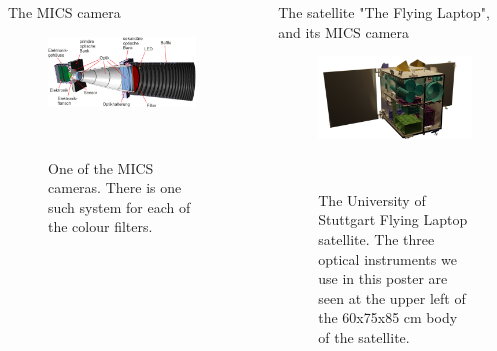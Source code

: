 \documentclass[final,hyperref={pdfpagelabels=false}]{beamer}
\begin{document}
\begin{frame}[t]
\begin{columns}[t]
\begin{column}{.23\textwidth}
\begin{block}{The MICS camera}
\begin{figure}
\includegraphics[scale=0.56]{fig/mics_schnittansicht.png}
\caption{One of the MICS cameras. There is one such system for each of the colour filters.}~\label{fig:MICS}
\end{figure}
\end{block}

\end{column}




\begin{column}{.01\textwidth}\end{column} %
 
\begin{column}{.23\textwidth} %



\begin{block}{The satellite "The Flying Laptop", and its MICS camera}
\begin{figure}
\includegraphics[scale=6]{fig/flp_inside.png}
\caption{The University of Stuttgart Flying Laptop satellite. The three optical instruments we use in this poster are seen at the upper left of the 60x75x85 cm body of the satellite.}~\label{fig:flp}
\end{figure}


\end{block}
\end{column}
\end{columns}
\end{frame}
\end{document}
